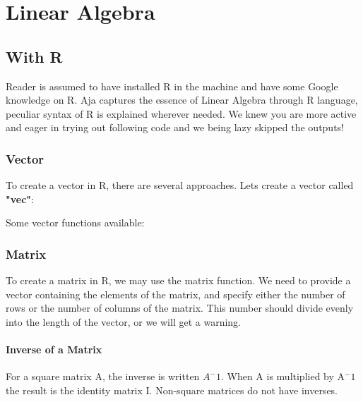 \chapter{Linear Algebra}

\section{With R}
Reader is assumed to have installed R in the machine and have some Google knowledge on R. Aja captures the essence of Linear Algebra through R language, peculiar syntax of R is explained wherever needed. We knew you are more active and eager in trying out following code and we being lazy skipped the outputs!

\subsection{Vector}
To create a vector in R, there are several approaches. 
Lets create a vector called \textbf{"vec"}:


Some vector functions available:


\subsection{Matrix}
To create a matrix in R, we may use the matrix function.  We need to provide a vector containing the elements of the matrix, and specify either the number of rows or the number of columns of the matrix.  This number should divide evenly into the length of the vector, or we will get a warning.  \\

\subsubsection{Inverse of a Matrix}
For a square matrix A, the inverse is written $A^-1$. When A is multiplied by A$^-1$ the result is the identity matrix I. Non-square matrices do not have inverses.

